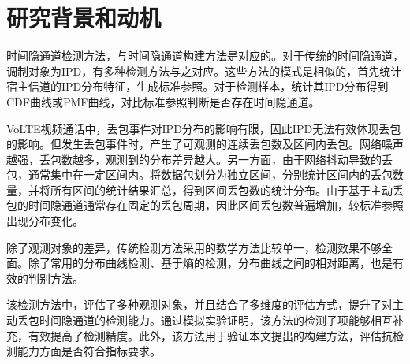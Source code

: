 \section{研究背景和动机}
\label{chap:analyze:motivation}

时间隐通道检测方法，与时间隐通道构建方法是对应的。对于传统的时间隐通道，调制对象为IPD，有多种检测方法与之对应。这些方法的模式是相似的，首先统计宿主信道的IPD分布特征，生成标准参照。对于检测样本，统计其IPD分布得到CDF曲线或PMF曲线，对比标准参照判断是否存在时间隐通道。

VoLTE视频通话中，丢包事件对IPD分布的影响有限，因此IPD无法有效体现丢包的影响。但发生丢包事件时，产生了可观测的连续丢包数及区间内丢包。网络噪声越强，丢包数越多，观测到的分布差异越大。另一方面，由于网络抖动导致的丢包，通常集中在一定区间内。将数据包划分为独立区间，分别统计区间内的丢包数量，并将所有区间的统计结果汇总，得到区间丢包数的统计分布。由于基于主动丢包的时间隐通道通常存在固定的丢包周期，因此区间丢包数普遍增加，较标准参照出现分布变化。

除了观测对象的差异，传统检测方法采用的数学方法比较单一，检测效果不够全面。除了常用的分布曲线检测、基于熵的检测，分布曲线之间的相对距离，也是有效的判别方法。

该检测方法中，评估了多种观测对象，并且结合了多维度的评估方式，提升了对主动丢包时间隐通道的检测能力。通过模拟实验证明，该方法的检测子项能够相互补充，有效提高了检测精度。此外，该方法用于验证本文提出的构建方法，评估抗检测能力方面是否符合指标要求。